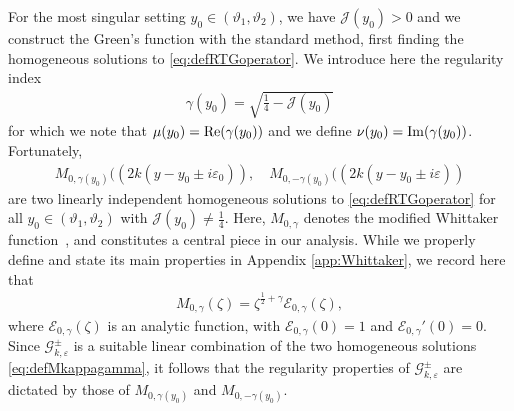 \documentclass[11pt,reqno]{amsproc}
\theoremstyle{definition}
\numberwithin{equation}{section}
\newcommand{\G}{{\mathcal{G}}}
\newcommand{\cJ}{{\mathcal{J}}}
\newcommand{\ep}{\varepsilon}
\def\Re{{\rm Re}}
\def\Im{{\rm Im}}
\begin{document}
For the most singular setting $y_0\in (\vartheta_1,\vartheta_2)$, we have $\cJ(y_0)>0$ and we construct the Green's function with the standard method, first finding the homogeneous solutions to \eqref{eq:defRTGoperator}. We introduce here the regularity index
\begin{align}
    \gamma(y_0) = \sqrt{\frac14 - \cJ(y_0)}
\end{align}
for which we note that $\mu(y_0) = \Re(\gamma(y_0))$ and we define $\nu(y_0) = \Im( \gamma(y_0))$. Fortunately, 
\begin{align}\label{eq:defMkappagamma}
M_{0, \gamma(y_0)}((2k(y-y_0\pm i\ep_0)), \quad M_{0, -\gamma(y_0)}((2k(y-y_0\pm i\ep))
\end{align}
are two linearly independent homogeneous solutions to \eqref{eq:defRTGoperator} for all $y_0\in (\vartheta_1, \vartheta_2)$ with $\cJ(y_0)\neq \frac14$. Here, $M_{0,\gamma}$ denotes the modified Whittaker function~\cite{Whittaker03}, and constitutes a central piece in our analysis. While we properly define and state its main properties in Appendix \ref{app:Whittaker}, we record here that 
\begin{align}\label{eq:asymptoticMkappagamma}
M_{0,\gamma}(\zeta)= \zeta^{\frac12+\gamma}\mathcal{E}_{0,\gamma}(\zeta),
\end{align} 
where $\mathcal{E}_{0,\gamma}(\zeta)$ is an analytic function, with $\mathcal{E}_{0,\gamma}(0)=1$ and $ \mathcal{E}_{0,\gamma} ' (0) = 0$. Since $\G_{k,\ep}^\pm$ is a suitable linear combination of the two homogeneous solutions \eqref{eq:defMkappagamma}, it follows that the regularity properties of $\G_{k,\ep}^\pm$ are dictated by those of $M_{0,\gamma(y_0)}$ and $M_{0,-\gamma(y_0)}$. 
\end{document}
